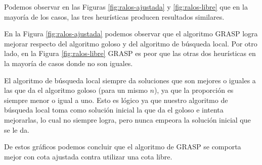 Podemos observar en las Figuras \ref{fig:ralos-ajustada} y \ref{fig:ralos-libre} que en la mayoría de los casos, las tres heurísticas producen resultados similares.

En la Figura \ref{fig:ralos-ajustada} podemos observar que el algoritmo GRASP logra mejorar respecto del algoritmo goloso y del algoritmo de búsqueda local. Por otro lado, en la Figura \ref{fig:ralos-libre} GRASP es peor que las otras dos heurísticas en la mayoría de casos donde no son iguales.

El algoritmo de búsqueda local siempre da soluciones que son mejores o iguales a las que da el algoritmo goloso (para un mismo $n$), ya que la proporción es siempre menor o igual a uno. Esto es lógico ya que nuestro algoritmo de búsqueda local toma como solución inicial la que da el goloso e intenta mejorarlas, lo cual no siempre logra, pero nunca empeora la solución inicial que se le da.

De estos gráficos podemos concluir que el algoritmo de GRASP se comporta mejor con cota ajustada contra utilizar una cota libre.

